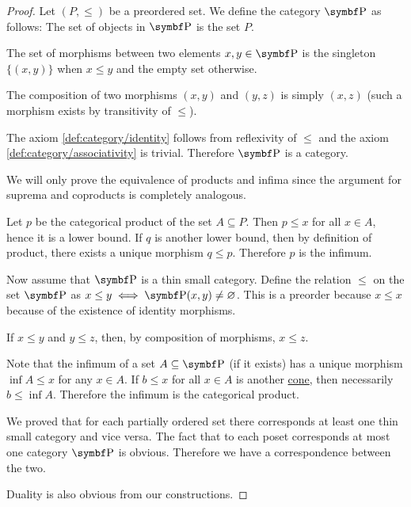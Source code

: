 \begin{proof}
  \Sufficiency Let \( (P, \leq) \) be a preordered set. We define the category \( \Cat{P} \) as follows:
   The set of objects in \( \Cat{P} \) is the set \( P \).

   The set of morphisms between two elements \( x, y \in \Cat{P} \) is the singleton \( \{ (x, y) \} \) when \( x \leq y \) and the empty set otherwise.

   The composition of two morphisms \( (x, y) \) and \( (y, z) \) is simply \( (x, z) \) (such a morphism exists by transitivity of \( \leq \)).

  The axiom \ref{def:category/identity} follows from reflexivity of \( \leq \) and the axiom \ref{def:category/associativity} is trivial. Therefore \( \Cat{P} \) is a category.

  We will only prove the equivalence of products and infima since the argument for suprema and coproducts is completely analogous.

  Let \( p \) be the categorical product of the set \( A \subseteq P \). Then \( p \leq x \) for all \( x \in A \), hence it is a lower bound. If \( q \) is another lower bound, then by definition of product, there exists a unique morphism \( q \leq p \). Therefore \( p \) is the infimum.

  \Necessity Now assume that \( \Cat{P} \) is a thin small category. Define the relation \( \leq \) on the set \( \Cat{P} \) as \( x \leq y \iff \Cat{P}(x, y) \neq \varnothing \). This is a preorder because
   \( x \leq x \) because of the existence of identity morphisms.

   If \( x \leq y \) and \( y \leq z \), then, by composition of morphisms, \( x \leq z \).

  Note that the infimum of a set \( A \subseteq \Cat{P} \) (if it exists) has a unique morphism \( \inf A \leq x \) for any \( x \in A \). If \( b \leq x \) for all \( x \in A \) is another \hyperref[def:categorical_cone]{cone}, then necessarily \( b \leq \inf A \). Therefore the infimum is the categorical product.

  We proved that for each partially ordered set there corresponds at least one thin small category and vice versa. The fact that to each poset corresponds at most one category \( \Cat{P} \) is obvious. Therefore we have a correspondence between the two.

  Duality is also obvious from our constructions.
\end{proof}

